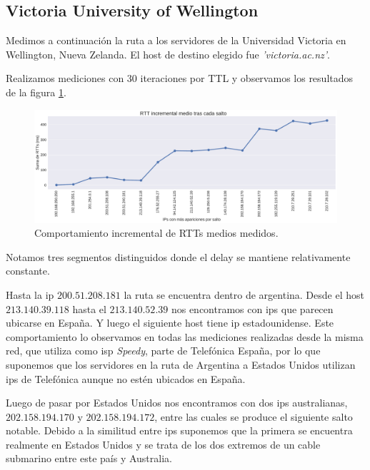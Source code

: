 \subsection{Victoria University of Wellington}

Medimos a continuación la ruta a los servidores de la Universidad Victoria en Wellington, Nueva Zelanda. El host de destino elegido fue \emph{'victoria.ac.nz'}.

Realizamos mediciones con 30 iteraciones por TTL y observamos los resultados de la figura \ref{fig:victoria-incrementales}.
\\

\begin{figure}[H]
    \centering
    \includegraphics[width=1\textwidth, height=1\textheight, keepaspectratio]{../img/victoria-ac-nz-incrementales}
    \caption{Comportamiento incremental de RTTs medios medidos.}
    \label{fig:victoria-incrementales}
\end{figure}

Notamos tres segmentos distinguidos donde el delay se mantiene relativamente constante.

Hasta la ip $200.51.208.181$ la ruta se encuentra dentro de argentina.
Desde el host $213.140.39.118$ hasta el $213.140.52.39$ nos encontramos con ips que parecen ubicarse en España. Y luego el siguiente host tiene ip estadounidense.
Este comportamiento lo observamos en todas las mediciones realizadas desde la misma red, que utiliza como isp \textit{Speedy}, parte de Telefónica España, por lo que suponemos que los servidores en la ruta de Argentina a Estados Unidos utilizan ips de Telefónica aunque no estén ubicados en España.

Luego de pasar por Estados Unidos nos encontramos con dos ips australianas, $202.158.194.170$ y $202.158.194.172$, entre las cuales se produce el siguiente salto notable.
Debido a la similitud entre ips suponemos que la primera se encuentra realmente en Estados Unidos y se trata de los dos extremos de un cable submarino entre este país y Australia.

